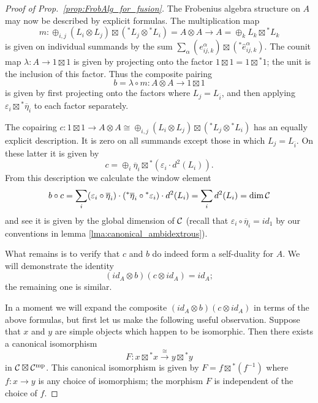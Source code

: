 \documentclass{amsart}
\begin{document}
\begin{proof}[Proof of Prop.~\ref{prop:FrobAlg_for_fusion}]
The Frobenius algebra structure on $A$ may now be described by explicit formulas. The multiplication map 
\begin{equation*}
	m: \oplus_{i,j} (L_i \otimes L_j) \boxtimes ({}^*L_j \otimes {}^*L_i) = A \otimes A \to A = \oplus_k L_k \boxtimes {}^*L_k
\end{equation*}
is given on individual summands by the sum $\sum_\alpha (e_{ij,k}^\alpha) \boxtimes ({}^*\hat{e}_{ij, k}^\alpha)$. The counit map $\lambda: A \to 1 \boxtimes 1$ is given by projecting onto the factor $1 \boxtimes 1 = 1 \boxtimes {}^*1$; the unit is the inclusion of this factor. Thus the composite pairing 
\begin{equation*}
	b=\lambda \circ m: A \otimes A \to 1 \boxtimes 1
\end{equation*}
 is given by first projecting onto the factors where $L_j = L_{\overline{i}}$, and then applying $\varepsilon_i \boxtimes {}^*\overline{\eta}_i$ to each factor separately. 

The copairing $c: 1 \boxtimes 1 \to A \otimes A \cong \oplus_{i,j} (L_i \otimes L_j) \boxtimes ({}^*L_j \otimes {}^*L_i)$ has an equally explicit description. It is zero on all summands except those in which $L_j = L_{\overline{i}}$. On these latter it is given by
\begin{equation*}
	c = \oplus_i \overline{\eta}_i \boxtimes {}^*( \varepsilon_i \cdot d^2(L_i)).
\end{equation*}
From this description we calculate the window element
\begin{equation*}
	b \circ c = \sum_i (\varepsilon_i \circ \overline{\eta}_i) \cdot ({}^*\overline{\eta}_i \circ {}^*\varepsilon_i) \cdot d^2(L_i) = \sum_i d^2(L_i) = \dim \mathcal C
\end{equation*} 
and see it is given by the global dimension of $\mathcal C$ (recall that $\varepsilon_i \circ \overline{\eta}_i = id_1$ by our conventions in lemma \ref{lma:canonical_ambidextrous}). 

What remains is to verify that $c$ and $b$ do indeed form a self-duality for $A$. We will demonstrate the identity
\begin{equation*}
	(id_A \otimes b) (c \otimes id_A)  = id_A;
\end{equation*}
the remaining one is similar. 

In a moment we will expand the composite $(id_A \otimes b) (c \otimes id_A)$ in terms of the above formulas, but first let us make the following useful observation. Suppose that $x$ and $y$ are simple objects which happen to be isomorphic. Then there exists a canonical isomorphism
\begin{equation*}
	F: x \boxtimes {}^{*}x \stackrel{\cong}{\to}  y \boxtimes {}^*y 
\end{equation*}
in $\mathcal C \boxtimes \mathcal C^{\mathrm{mp}}$. This canonical isomorphism is given by $F = f \boxtimes {}^{*}(f^{-1})$ where $f: x \to y$ is any choice of isomorphism; the morphism $F$ is independent of the choice of $f$.


\end{proof}
\end{document}
